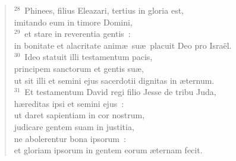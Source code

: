 \begin{flushleft}\begin{verse}${}^{28}$~Phinees, filius Eleazari, tertius in gloria est,\\ imitando eum in timore Domini,\\
${}^{29}$~et stare in reverentia gentis~:\\ in bonitate et alacritate anim\ae\ su\ae\ placuit Deo pro Isra\"el.\\
${}^{30}$~Ideo statuit illi testamentum pacis,\\ principem sanctorum et gentis su\ae ,\\ ut sit illi et semini ejus sacerdotii dignitas in \ae ternum.\\
${}^{31}$~Et testamentum David regi filio Jesse de tribu Juda,\\ h\ae reditas ipsi et semini ejus~:\\ ut daret sapientiam in cor nostrum,\\ judicare gentem suam in justitia,\\ ne abolerentur bona ipsorum~:\\ et gloriam ipsorum in gentem eorum \ae ternam fecit.\end{verse}\end{flushleft}


